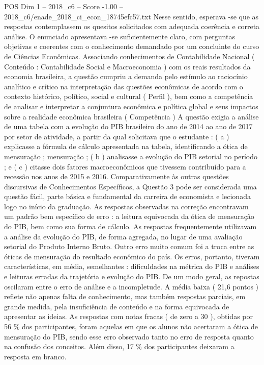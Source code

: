 \begin{textsample}{POS Dim 1 – 2018\_c6 – Score -1.00 – 2018\_c6/enade\_2018\_ci\_econ\_18745efc57.txt}
Nesse sentido, esperava -se que as respostas contemplassem os quesitos solicitados com adequada coerência e correta análise.
O enunciado apresentava -se suficientemente claro, com perguntas objetivas e coerentes com o conhecimento demandado por um concluinte do curso de Ciências Econômicas.
Associando conhecimentos de Contabilidade Nacional ( Conteúdo : Contabilidade Social e Macroeconomia ) com os reais resultados da economia brasileira, a questão cumpriu a demanda pelo estímulo ao raciocínio analítico e crítico na interpretação das questões econômicas de acordo com o contexto histórico, político, social e cultural ( Perfil ), bem como a competência de analisar e interpretar a conjuntura econômica e política global e seus impactos sobre a realidade econômica brasileira ( Competência ) A questão exigia a análise de uma tabela com a evolução do PIB brasileiro do ano de 2014 ao ano de 2017 por setor de atividade, a partir da qual solicitava que o estudante : ( a ) explicasse a fórmula de cálculo apresentada na tabela, identificando a ótica de mensuração ; mensuração ; ( b ) analisasse a evolução do PIB setorial no período ; e ( c ) citasse dois fatores macroeconômicos que tivessem contribuído para a recessão nos anos de 2015 e 2016.
Comparativamente às outras questões discursivas de Conhecimentos Específicos, a Questão 3 pode ser considerada uma questão fácil, parte básica e fundamental da carreira de economista e lecionada logo no início da graduação.
As respostas observadas na correção encontravam um padrão bem específico de erro : a leitura equivocada da ótica de mensuração do PIB, bem como sua forma de cálculo.
As respostas frequentemente utilizavam a análise da evolução do PIB, de forma agregada, no lugar de uma avaliação setorial do Produto Interno Bruto.
Outro erro muito comum foi a troca entre as óticas de mensuração do resultado econômico do país.
Os erros, portanto, tiveram características, em média, semelhantes : dificuldades na métrica do PIB e análises e leituras erradas da trajetória e evolução do PIB.
De um modo geral, as repostas oscilaram entre o erro de análise e a incompletude.
A média baixa ( 21,6 pontos ) reflete não apenas falta de conhecimento, mas também respostas parciais, em grande medida, pela insuficiência de conteúdo e na forma equivocada de apresentar as ideias.
As respostas com notas fracas ( de zero a 30 ), obtidas por 56 \% dos participantes, foram aquelas em que os alunos não acertaram a ótica de mensuração do PIB, sendo esse erro observado tanto no erro de resposta quanto na confusão dos conceitos.
Além disso, 17 \% dos participantes deixaram a resposta em branco.

\end{textsample}
